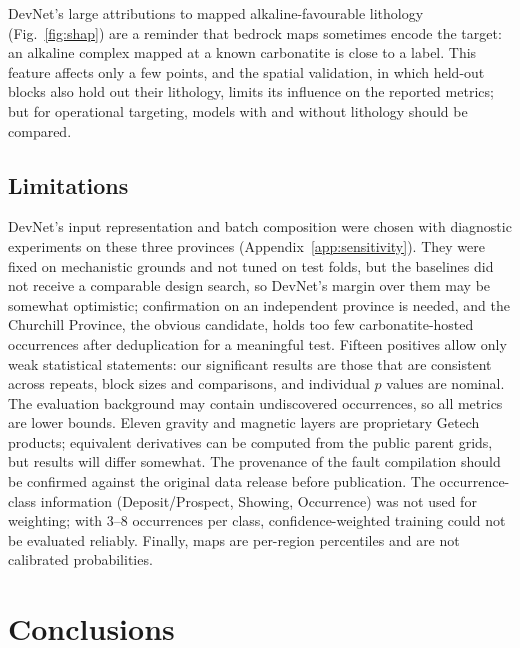 \documentclass[pdflatex,sn-apa]{sn-jnl}
\begin{document}
DevNet's large attributions to mapped alkaline-favourable lithology (Fig.~\ref{fig:shap}) are a reminder that bedrock maps sometimes encode the target: an alkaline complex mapped at a known carbonatite is close to a label. This feature affects only a few points, and the spatial validation, in which held-out blocks also hold out their lithology, limits its influence on the reported metrics; but for operational targeting, models with and without lithology should be compared.

\subsection{Limitations}\label{sec:limitations}

DevNet's input representation and batch composition were chosen with diagnostic experiments on these three provinces (Appendix~\ref{app:sensitivity}). They were fixed on mechanistic grounds and not tuned on test folds, but the baselines did not receive a comparable design search, so DevNet's margin over them may be somewhat optimistic; confirmation on an independent province is needed, and the Churchill Province, the obvious candidate, holds too few carbonatite-hosted occurrences after deduplication for a meaningful test. Fifteen positives allow only weak statistical statements: our significant results are those that are consistent across repeats, block sizes and comparisons, and individual $p$ values are nominal. The evaluation background may contain undiscovered occurrences, so all metrics are lower bounds. Eleven gravity and magnetic layers are proprietary Getech products; equivalent derivatives can be computed from the public parent grids, but results will differ somewhat. The provenance of the fault compilation should be confirmed against the original data release before publication. The occurrence-class information (Deposit/Prospect, Showing, Occurrence) was not used for weighting; with 3--8 occurrences per class, confidence-weighted training could not be evaluated reliably. Finally, maps are per-region percentiles and are not calibrated probabilities.

\section{Conclusions}\label{sec:conclusions}
\end{document}

